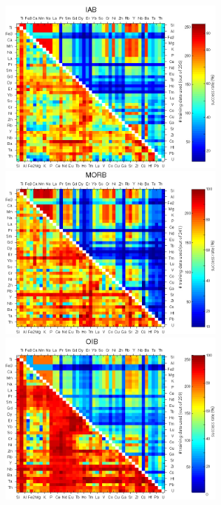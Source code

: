 \begin{figure}[htbp]
  \centering
  \includegraphics[width=300]{figures/xPlotTrace2_linear_IAB.jpg}
  \includegraphics[width=300]{figures/xPlotTrace2_linear_MORB.jpg}\\
  \includegraphics[width=300]{figures/xPlotTrace2_linear_OIB.jpg}

\end{figure}
